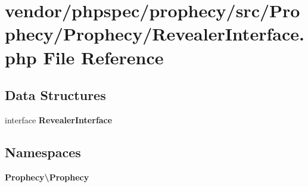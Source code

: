 \section{vendor/phpspec/prophecy/src/\+Prophecy/\+Prophecy/\+Revealer\+Interface.php File Reference}
\label{_revealer_interface_8php}
\subsection*{Data Structures}
\begin{DoxyCompactItemize}
\item 
interface {\bf Revealer\+Interface}
\end{DoxyCompactItemize}
\subsection*{Namespaces}
\begin{DoxyCompactItemize}
\item 
 {\bf Prophecy\textbackslash{}\+Prophecy}
\end{DoxyCompactItemize}
